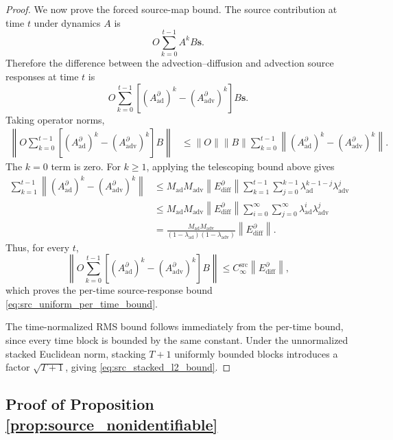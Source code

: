 \begin{proof}
We now prove the forced source-map bound. The source contribution at
time \(t\) under dynamics \(A\) is
\[
O\sum_{k=0}^{t-1} A^k B\mathbf s.
\]
Therefore the difference between the advection--diffusion and advection
source responses at time \(t\) is
\[
O\sum_{k=0}^{t-1}
\left[
(A_{\mathrm{ad}}^{\partial})^k
-
(A_{\mathrm{adv}}^{\partial})^k
\right]B\mathbf s .
\]
Taking operator norms,
\begin{align}
\left\|
O\sum_{k=0}^{t-1}
\left[
(A_{\mathrm{ad}}^{\partial})^k
-
(A_{\mathrm{adv}}^{\partial})^k
\right]B
\right\|
&\le
\|O\|\|B\|
\sum_{k=0}^{t-1}
\left\|
(A_{\mathrm{ad}}^{\partial})^k
-
(A_{\mathrm{adv}}^{\partial})^k
\right\| .
\end{align}
The \(k=0\) term is zero. For \(k\ge 1\), applying the telescoping bound
above gives
\begin{align}
\sum_{k=1}^{t-1}
\left\|
(A_{\mathrm{ad}}^{\partial})^k
-
(A_{\mathrm{adv}}^{\partial})^k
\right\|
&\le
M_{\mathrm{ad}}M_{\mathrm{adv}}
\left\|
E_{\mathrm{diff}}^{\partial}
\right\|
\sum_{k=1}^{t-1}
\sum_{j=0}^{k-1}
\lambda_{\mathrm{ad}}^{k-1-j}
\lambda_{\mathrm{adv}}^j \nonumber \\
&\le
M_{\mathrm{ad}}M_{\mathrm{adv}}
\left\|
E_{\mathrm{diff}}^{\partial}
\right\|
\sum_{i=0}^{\infty}
\sum_{j=0}^{\infty}
\lambda_{\mathrm{ad}}^i
\lambda_{\mathrm{adv}}^j \nonumber \\
&=
\frac{
M_{\mathrm{ad}}M_{\mathrm{adv}}
}{
(1-\lambda_{\mathrm{ad}})(1-\lambda_{\mathrm{adv}})
}
\left\|
E_{\mathrm{diff}}^{\partial}
\right\|.
\end{align}
Thus, for every \(t\),
\[
\left\|
O\sum_{k=0}^{t-1}
\left[
(A_{\mathrm{ad}}^{\partial})^k
-
(A_{\mathrm{adv}}^{\partial})^k
\right]B
\right\|
\le
C_{\infty}^{\mathrm{src}}
\left\|
E_{\mathrm{diff}}^{\partial}
\right\|,
\]
which proves the per-time source-response bound
\eqref{eq:src_uniform_per_time_bound}.

The time-normalized RMS bound follows immediately from the per-time
bound, since every time block is bounded by the same constant. Under the
unnormalized stacked Euclidean norm, stacking \(T+1\) uniformly bounded
blocks introduces a factor \(\sqrt{T+1}\), giving
\eqref{eq:src_stacked_l2_bound}.
\end{proof}


\subsection{Proof of Proposition \ref{prop:source_nonidentifiable}}

